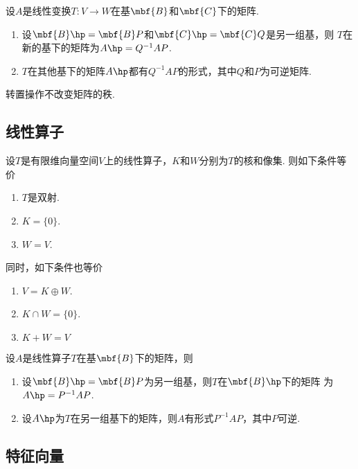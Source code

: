   \begin{thm}
    设$A$是线性变换$T:V\to W$在基$\mbf{B}$和$\mbf{C}$下的矩阵.
    \begin{enumerate}
      \item 设$\mbf{B}\hp=\mbf{B}P$和$\mbf{C}\hp=\mbf{C}Q$是另一组基，则
        $T$在新的基下的矩阵为$A\hp = Q^{-1}AP$.
      \item $T$在其他基下的矩阵$A\hp$都有$Q^{-1}AP$的形式，其中$Q$和$P$为可逆矩阵.
    \end{enumerate}
  \end{thm}

  \begin{thm}
    转置操作不改变矩阵的秩.
  \end{thm}

\subsection{线性算子}

  \begin{thm}
    设$T$是有限维向量空间$V$上的线性算子，$K$和$W$分别为$T$的核和像集. 则如下条件等价
    \begin{enumerate}
      \item $T$是双射.
      \item $K=\{0\}$.
      \item $W=V$.
    \end{enumerate}
    同时，如下条件也等价
    \begin{enumerate}
      \item $V=K\oplus W$.
      \item $K\cap W = \{0\}$.
      \item $K+W=V$
    \end{enumerate}
  \end{thm}

  \begin{thm}
    设$A$是线性算子$T$在基$\mbf{B}$下的矩阵，则
    \begin{enumerate}
      \item 设$\mbf{B}\hp = \mbf{B}P$为另一组基，则$T$在$\mbf{B}\hp$下的矩阵
        为$A\hp=P^{-1}AP$.
      \item 设$A\hp$为$T$在另一组基下的矩阵，则$A$有形式$P^{-1}AP$，其中$P$可逆.
    \end{enumerate}
  \end{thm}

\subsection{特征向量}



